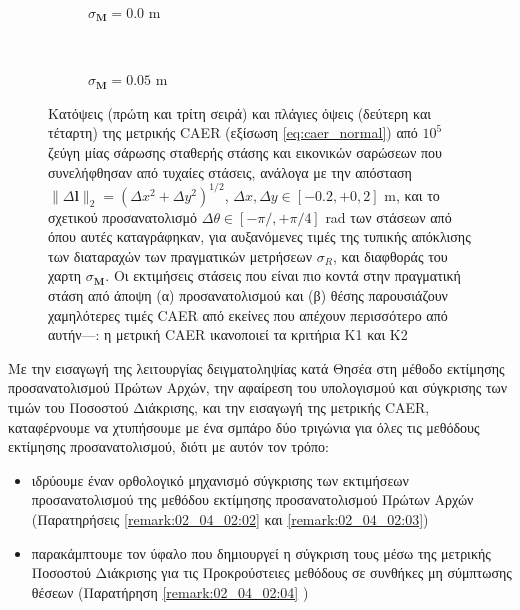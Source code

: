 \begin{figure}
  \begin{subfigure}{\linewidth}\hspace{1cm}
    
    \vspace{0.25cm}
    \caption{\small $\sigma_{\bm{M}} = 0.0$ m}
    \vspace{0.5cm}
  \end{subfigure}\\%
  \begin{subfigure}{\linewidth}\hspace{1cm}
    
    \vspace{0.25cm}
    \caption{\small $\sigma_{\bm{M}} = 0.05$ m}
    \vspace{0.5cm}
  \end{subfigure}%
  \vspace{-0.25cm}
  \caption{\small Κατόψεις (πρώτη και τρίτη σειρά) και πλάγιες όψεις
           (δεύτερη και τέταρτη) της μετρικής CAER (εξίσωση
           \ref{eq:caer_normal}) από $10^5$ ζεύγη μίας σάρωσης σταθερής στάσης
           και εικονικών σαρώσεων που συνελήφθησαν από τυχαίες στάσεις, ανάλογα
           με την απόσταση $\|\Delta \bm{l}\|_2 = (\Delta x^2 + \Delta
           y^2)^{1/2}$, $\Delta x, \Delta y \in [-0.2, +0,2]$ m, και το
           σχετικού προσανατολισμό $\Delta \theta \in [-\pi/, +\pi/4]$ rad των
           στάσεων από όπου αυτές καταγράφηκαν, για αυξανόμενες τιμές της
           τυπικής απόκλισης των διαταραχών των πραγματικών μετρήσεων
           $\sigma_R$, και διαφθοράς του χαρτη $\sigma_{\bm{M}}$. Οι εκτιμήσεις
           στάσεις που είναι πιο κοντά στην πραγματική στάση από άποψη (α)
           προσανατολισμού και (β) θέσης παρουσιάζουν χαμηλότερες τιμές CAER
           από εκείνες που απέχουν περισσότερο από αυτήν---: η μετρική
           CAER ικανοποιεί τα κριτήρια Κ1 και Κ2}
  \label{fig:02_04_04:caer}
\end{figure}

Με την εισαγωγή της λειτουργίας δειγματοληψίας κατά Θησέα στη μέθοδο εκτίμησης
προσανατολισμού Πρώτων Αρχών, την αφαίρεση του υπολογισμού και σύγκρισης των
τιμών του Ποσοστού Διάκρισης, και την εισαγωγή της μετρικής CAER, καταφέρνουμε
να χτυπήσουμε με ένα σμπάρο δύο τριγώνια για όλες τις μεθόδους εκτίμησης
προσανατολισμού, διότι με αυτόν τον τρόπο:

\begin{itemize}
  \item ιδρύουμε έναν ορθολογικό μηχανισμό σύγκρισης των
        εκτιμήσεων προσανατολισμού της μεθόδου εκτίμησης προσανατολισμού Πρώτων
        Αρχών (Παρατηρήσεις \ref{remark:02_04_02:02} και
        \ref{remark:02_04_02:03})
  \item παρακάμπτουμε τον ύφαλο που δημιουργεί η σύγκριση τους μέσω της μετρικής
        Ποσοστού Διάκρισης για τις Προκρούστειες μεθόδους σε συνθήκες μη
        σύμπτωσης θέσεων (Παρατήρηση \ref{remark:02_04_02:04} )
\end{itemize}

